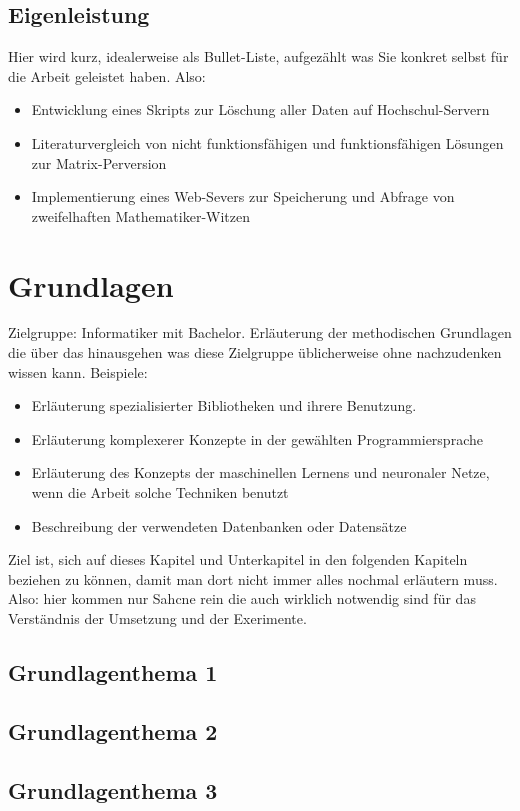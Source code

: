 \documentclass[12pt,oneside]{article}
\begin{document}
\subsection{Eigenleistung}
Hier wird kurz, idealerweise als Bullet-Liste, aufgezählt was Sie konkret selbst für die Arbeit geleistet haben. Also:
\begin{itemize}
    \item Entwicklung eines Skripts zur Löschung aller Daten auf Hochschul-Servern
    \item Literaturvergleich von nicht funktionsfähigen und funktionsfähigen Lösungen zur Matrix-Perversion
    \item Implementierung eines Web-Severs zur Speicherung und Abfrage von zweifelhaften Mathematiker-Witzen
\end{itemize}

\section{Grundlagen}\label{sec:grundlagen}
Zielgruppe: Informatiker mit Bachelor. Erläuterung der methodischen Grundlagen die
über das hinausgehen was diese Zielgruppe üblicherweise ohne nachzudenken wissen kann.
Beispiele:
\begin{itemize}
\item Erläuterung spezialisierter Bibliotheken und ihrere Benutzung.
\item Erläuterung komplexerer Konzepte in der gewählten Programmiersprache
\item Erläuterung des Konzepts der maschinellen Lernens und neuronaler Netze, wenn die Arbeit solche Techniken benutzt
\item Beschreibung der verwendeten Datenbanken oder Datensätze
\end{itemize}
%
Ziel ist, sich auf dieses Kapitel und Unterkapitel in den folgenden Kapiteln beziehen zu können, damit man dort nicht immer alles nochmal erläutern muss. Also: hier kommen nur Sahcne rein die auch wirklich notwendig sind für das Verständnis der Umsetzung und der Exerimente.
\subsection{Grundlagenthema 1}\label{sec:grundlagen1}
\subsection{Grundlagenthema 2}\label{sec:grundlagen2}
\subsection{Grundlagenthema 3}\label{sec:grundlagen3}
%
\end{document}
